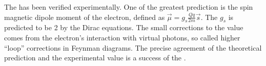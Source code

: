The \QED has been verified experimentally. One of the greatest prediction is the spin magnetic dipole moment of the electron, defined as $\vec{\mu} = g_{s}\frac{Qq}{2m} \vec{s}$. The $g_{s}$ is predicted to be 2 by the Dirac equations. The small corrections to the value comes from the electron's interaction with virtual photons, so called higher ``loop'' corrections in Feynman diagrams. The precise agreement of the theoretical prediction and the experimental value is a success of the \QED.


